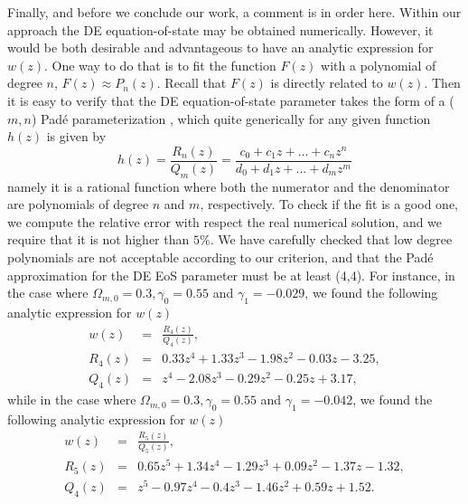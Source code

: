 \documentclass[aps,prd,amsmath,amssymb]{revtex4}
\begin{document}
Finally, and before we conclude our work, a comment is in order here. Within our approach the DE equation-of-state may be obtained numerically. However, it would be both desirable and advantageous to have an analytic expression for $w(z)$. One way to do that is to fit the function $F(z)$ with a polynomial of degree $n$, $F(z) \approx P_n(z)$. Recall that $F(z)$ is directly related to $w(z)$. Then it is easy to verify that the DE equation-of-state parameter takes the form of a ($m,n$) Pad{\'e} parameterization \cite{PADE}, which quite generically for any given function $h(z)$ is given by \cite{pade1,pade2}
\begin{equation}
h(z) = \frac{R_n(z)}{Q_m(z)} = \frac{c_0+c_1 z + ... + c_n z^n}{d_0+d_1 z + ... + d_m z^m}
\end{equation}
namely it is a rational function where both the numerator and the denominator are polynomials of degree $n$ and $m$, respectively. To check if the fit is a good one, we compute the relative error with respect the real numerical solution, and we require that it is not higher than $5 \%$. We have carefully checked that low degree polynomials are not acceptable according to our criterion, and that the Pad{\'e} approximation for the DE EoS parameter must be at least (4,4). For instance, in the case where $\Omega_{m,0}=0.3, \gamma_0=0.55$ and $\gamma_1=-0.029$, we found the following analytic expression for $w(z)$
\begin{eqnarray}
w(z) & = & \frac{R_4(z)}{Q_4(z)}, \\
R_4(z) & = & 0.33 z^4+1.33 z^3-1.98 z^2-0.03 z-3.25, \\
Q_4(z) & = & z^4-2.08 z^3-0.29 z^2-0.25 z+3.17,
\end{eqnarray}
while in the case where $\Omega_{m,0}=0.3, \gamma_0=0.55$ and $\gamma_1=-0.042$, we found the following analytic expression for $w(z)$
\begin{eqnarray}
w(z) & = & \frac{R_5(z)}{Q_5(z)}, \\
R_5(z) & = & 0.65 z^5 + 1.34 z^4-1.29 z^3 +0.09 z^2-1.37 z-1.32, \\
Q_4(z) & = & z^5 -0.97 z^4-0.4 z^3-1.46 z^2 + 0.59 z + 1.52.
\end{eqnarray}


\end{document}
